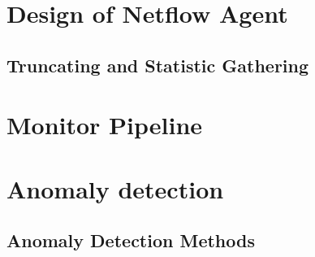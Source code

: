
\section{Design of Netflow Agent}
	\subsection{Truncating and Statistic Gathering}

\section{Monitor Pipeline}

\section{Anomaly detection}

	\subsection{Anomaly Detection Methods}
	
